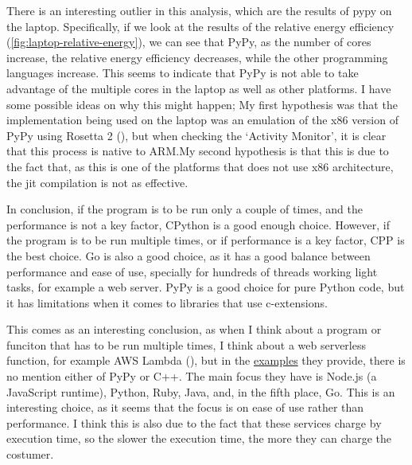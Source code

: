 There is an interesting outlier in this analysis, which are the results of pypy on the laptop. Specifically, if we look at the results of the relative energy efficiency (\autoref{fig:laptop-relative-energy}), we can see that PyPy, as the number of cores increase, the relative energy efficiency decreases, while the other programming languages increase. This seems to indicate that PyPy is not able to take advantage of the multiple cores in the laptop as well as other platforms. I have some possible ideas on why this might happen; My first hypothesis was that the implementation being used on the laptop was an emulation of the x86 version of PyPy using Rosetta 2 (\cite{apple:rosetta2}), but when checking the `Activity Monitor', it is clear that this process is native to ARM.\@ My second hypothesis is that this is due to the fact that, as this is one of the platforms that does not use x86 architecture, the \gls{jit} compilation is not as effective.

In conclusion, if the program is to be run only a couple of times, and the performance is not a key factor, \gls{CPython} is a good enough choice. However, if the program is to be run multiple times, or if performance is a key factor, \gls{CPP} is the best choice. Go is also a good choice, as it has a good balance between performance and ease of use, specially for hundreds of threads working light tasks, for example a web server. PyPy is a good choice for pure Python code, but it has limitations when it comes to libraries that use \glspl{c-extension}.

This comes as an interesting conclusion, as when I think about a program or funciton that has to be run multiple times, I think about a web serverless function, for example AWS Lambda (\cite{aws:lambda}), but in the \href{https://docs.aws.amazon.com/lambda/latest/dg/lambda-samples.html}{examples} they provide, there is no mention either of PyPy or C++. The main focus they have is Node.js (a JavaScript runtime), Python, Ruby, Java, and, in the fifth place, Go. This is an interesting choice, as it seems that the focus is on ease of use rather than performance. I think this is also due to the fact that these services charge by execution time, so the slower the execution time, the more they can charge the costumer. 

